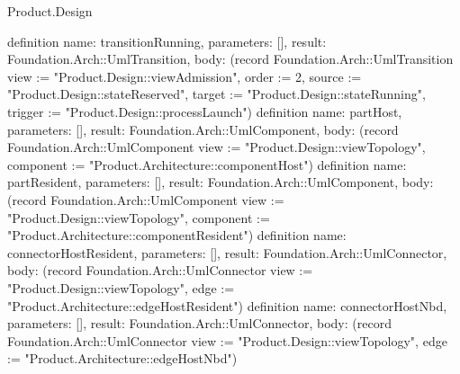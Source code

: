 \begin{lexlean}{Product.Design}
\begin{semanticmodule}
definition{
  name: transitionRunning, parameters: [], result: Foundation.Arch::UmlTransition,
  body: (record Foundation.Arch::UmlTransition {view := "Product.Design::viewAdmission", order := 2, source := "Product.Design::stateReserved", target := "Product.Design::stateRunning", trigger := "Product.Design::processLaunch"})
}
definition{
  name: partHost, parameters: [], result: Foundation.Arch::UmlComponent,
  body: (record Foundation.Arch::UmlComponent {view := "Product.Design::viewTopology", component := "Product.Architecture::componentHost"})
}
definition{
  name: partResident, parameters: [], result: Foundation.Arch::UmlComponent,
  body: (record Foundation.Arch::UmlComponent {view := "Product.Design::viewTopology", component := "Product.Architecture::componentResident"})
}
definition{
  name: connectorHostResident, parameters: [], result: Foundation.Arch::UmlConnector,
  body: (record Foundation.Arch::UmlConnector {view := "Product.Design::viewTopology", edge := "Product.Architecture::edgeHostResident"})
}
definition{
  name: connectorHostNbd, parameters: [], result: Foundation.Arch::UmlConnector,
  body: (record Foundation.Arch::UmlConnector {view := "Product.Design::viewTopology", edge := "Product.Architecture::edgeHostNbd"})
}
\end{semanticmodule}
\end{lexlean}
